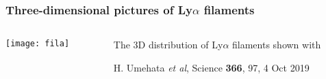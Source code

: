 \begin{frame}
  \frametitle{Three-dimensional pictures of Ly$\alpha$ filaments}
  \begin{columns}
  \begin{column}{0.5\textwidth}
  \texttt{[image: fila]}
  \end{column}
  \begin{column}{0.5\textwidth}
  The 3D distribution of
  Ly$\alpha$ filaments shown with

  


    {\tiny H. Umehata \emph{et al}, Science  \textbf{366}, 97, \alert{4 Oct 2019}}

  \end{column}
  \end{columns}

\end{frame}